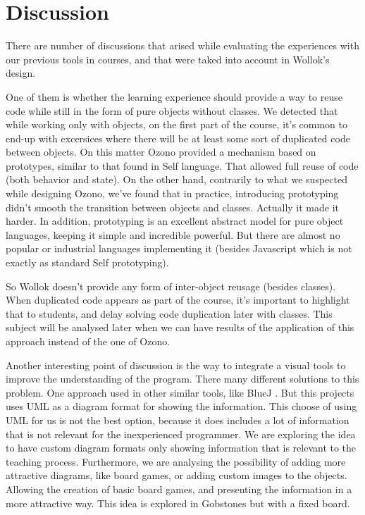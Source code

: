\section{Discussion}
\label{sec:discussion}

There are number of discussions that arised while evaluating the experiences
with our previous tools in courses, and that were taked into account in Wollok's
design.

One of them is whether the learning experience should provide a way to reuse
code while still in the form of pure objects without classes.
We detected that while working only with objects, on the first part of the
course, it's common to end-up with excersices where there will be at least some
sort of duplicated code between objects.
On this matter Ozono provided a mechanism based on prototypes, similar to that
found in Self language\cite{Ungar87self:the, Ungar91organizingprograms}. That
allowed full reuse of code (both behavior and state).
On the other hand, contrarily to what we suspected while designing Ozono, we've
found that in practice, introducing prototyping didn't smooth the transition
between objects and classes. Actually it made it harder.
In addition, prototyping is an excellent abstract model for pure object
languages, keeping it simple and incredible powerful. But there are almost no popular or industrial
languages implementing it (besides Javascript which is not exactly as standard
Self prototyping). 


So Wollok doesn't provide any form of inter-object reusage (besides classes).
When duplicated code appears as part of the course, it's important to
highlight that to students, and delay solving code duplication later with
classes. This subject will be analysed later when we can have results of the application of this approach instead of the one of Ozono.

Another interesting point of discussion is the way to integrate a visual tools to improve the understanding of the program. There many different solutions to this problem. One approach used in other similar tools, like BlueJ \cite{bennedsen_bluej_2010}. But this projects uses UML as a diagram format for showing the information. This choose of using UML for us is not the best option, because it does includes a lot of information that is not relevant for the inexperienced programmer. We are exploring the idea to have custom diagram formats only showing information that is relevant to the teaching process. Furthermore, we are analysing the possibility of adding more attractive diagrams, like board games, or adding custom images to the objects. Allowing the creation of basic board games, and presenting the information in a more attractive way. This idea is explored in Gobstones \cite{lopez_nombre_2012} but with a fixed board.

